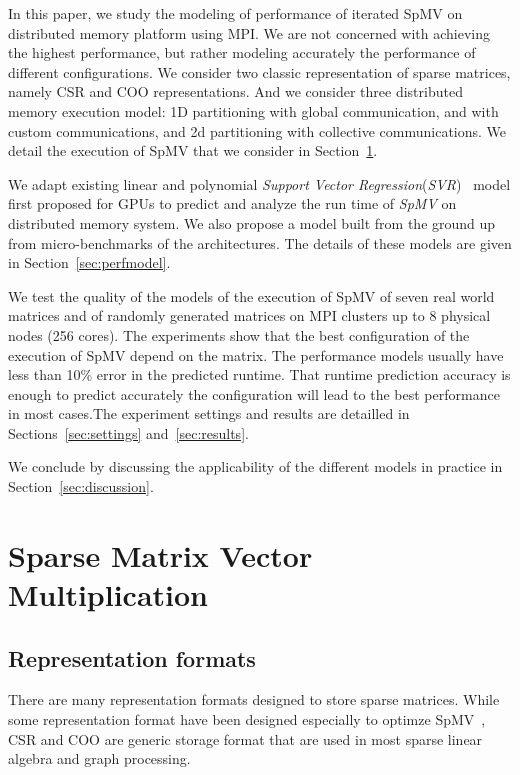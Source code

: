 \documentclass[sigconf,review,anonymous]{acmart}
\begin{document}
In this paper, we study the modeling of performance of iterated SpMV
on distributed memory platform using MPI. We are not concerned with
achieving the highest performance, but rather modeling accurately the
performance of different configurations. We consider two classic
representation of sparse matrices, namely CSR and COO
representations. And we consider three distributed memory execution
model: 1D partitioning with global communication, and with custom
communications, and 2d partitioning with collective communications. We detail the execution of SpMV that we consider in Section~\ref{sec:spmv}.

We adapt existing linear and polynomial \textit{Support Vector
  Regression}(\textit{SVR})~\cite{awad2015support} model first
proposed for GPUs to predict and analyze the run time of \textit{SpMV}
on distributed memory system. We also propose a model built from the
ground up from micro-benchmarks of the architectures. The details of these models are given in Section~\ref{sec:perfmodel}.

We test the quality of the models of the execution of SpMV of seven
real world matrices and of randomly generated matrices on MPI clusters
up to 8 physical nodes (256 cores). The experiments show that the best
configuration of the execution of SpMV depend on the matrix. The
performance models usually have less than 10\% error in the predicted
runtime. That runtime prediction accuracy is enough to predict
accurately the configuration will lead to the best performance in most
cases.The experiment settings and results are detailled in
Sections~\ref{sec:settings} and~\ref{sec:results}.


We conclude by discussing the applicability of the different models in
practice in Section~\ref{sec:discussion}.

\section{Sparse Matrix Vector Multiplication}
\label{sec:spmv}

\subsection{Representation formats}

There are many representation formats designed to store sparse
matrices. While some representation format have been designed
especially to optimze SpMV~\cite{almasri20, ashari2014fast,
  ashari2014efficient, baskaran2009optimizing, bell2009implementing,
  buluc2011reduced, bulucc2009parallel, choi2010model, deng2009taming,
  garland2008sparse, greathouse2014efficient, kourtis2010exploiting,
  li2013smat, li2013gpu, liu2013efficient, su2012clspmv,
  tang2015optimizing, vuduc2005oski, williams2007optimization,
  yan2014yaspmv}, CSR and COO are generic storage format that are used
in most sparse linear algebra and graph processing.
\end{document}
